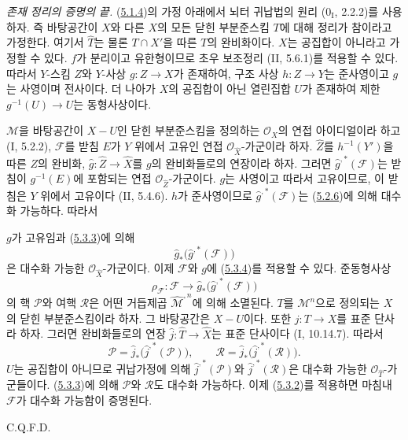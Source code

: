 \begin{env}[5.3.5]
\label{III.5.3.5-fr}
\emph{존재 정리의 증명의 끝.}
(\hyperref[III.5.1.4-fr]{5.1.4})의 가정 아래에서 뇌터 귀납법의
원리 ($0_{\mathrm I}$, 2.2.2)를 사용하자. 즉 바탕공간이 $X$와
다른 $X$의 모든 닫힌 부분준스킴 $T$에 대해 정리가 참이라고
가정한다. 여기서 $\widehat T$는 물론 $T\cap X'$을 따른 $T$의
완비화이다. $X$는 공집합이 아니라고 가정할 수 있다. $f$가
분리이고 유한형이므로 초우 보조정리 (II, 5.6.1)를 적용할 수
있다. 따라서 $Y$-스킴 $Z$와 $Y$-사상 $g:Z\to X$가 존재하여,
구조 사상 $h:Z\to Y$는 준사영이고 $g$는 사영이며 전사이다.
더 나아가 $X$의 공집합이 아닌 열린집합 $U$가 존재하여 제한
$g^{-1}(U)\to U$는 동형사상이다.

$\mathcal M$을 바탕공간이 $X-U$인 닫힌 부분준스킴을 정의하는
$\mathcal O_X$의 연접 아이디얼이라 하고 (I, 5.2.2),
$\mathcal F$를 받침 $E$가 $Y$ 위에서 고유인 연접
$\mathcal O_{\widehat X}$-가군이라 하자. $\widehat Z$를
$h^{-1}(Y')$을 따른 $Z$의 완비화,
$\widehat g:\widehat Z\to\widehat X$를 $g$의 완비화들로의
연장이라 하자. 그러면 $\widehat g^{,*}(\mathcal F)$는 받침이
$g^{-1}(E)$에 포함되는 연접 $\mathcal O_{\widehat Z}$-가군이다.
$g$는 사영이고 따라서 고유이므로, 이 받침은 $Y$ 위에서 고유이다
(II, 5.4.6). $h$가 준사영이므로
$\widehat g^{,*}(\mathcal F)$는
(\hyperref[III.5.2.6-fr]{5.2.6})에 의해 대수화 가능하다. 따라서


$g$가 고유임과 (\hyperref[III.5.3.3-fr]{5.3.3})에 의해
\[
\widehat g_*\bigl(\widehat g^{,*}(\mathcal F)\bigr)
\]
은 대수화 가능한 $\mathcal O_{\widehat X}$-가군이다. 이제
$\mathcal F$와 $g$에 (\hyperref[III.5.3.4-fr]{5.3.4})를 적용할
수 있다. 준동형사상
\[
\rho_{\mathcal F}:\mathcal F\to
\widehat g_*\bigl(\widehat g^{,*}(\mathcal F)\bigr)
\]
의 핵 $\mathcal P$와 여핵 $\mathcal R$은 어떤 거듭제곱
$\widehat{\mathcal M}^{,n}$에 의해 소멸된다. $T$를
$\mathcal M^n$으로 정의되는 $X$의 닫힌 부분준스킴이라 하자.
그 바탕공간은 $X-U$이다. 또한 $j:T\to X$를 표준 단사라 하자.
그러면 완비화들로의 연장 $\widehat j:\widehat T\to\widehat X$는
표준 단사이다 (I, 10.14.7). 따라서
\[
\mathcal P=\widehat j_*\bigl(\widehat j^{,*}(\mathcal P)\bigr),
\qquad
\mathcal R=\widehat j_*\bigl(\widehat j^{,*}(\mathcal R)\bigr).
\]
$U$는 공집합이 아니므로 귀납가정에 의해
$\widehat j^{,*}(\mathcal P)$와
$\widehat j^{,*}(\mathcal R)$은 대수화 가능한
$\mathcal O_{\widehat T}$-가군들이다.
(\hyperref[III.5.3.3-fr]{5.3.3})에 의해 $\mathcal P$와
$\mathcal R$도 대수화 가능하다. 이제
(\hyperref[III.5.3.2-fr]{5.3.2})를 적용하면 마침내
$\mathcal F$가 대수화 가능함이 증명된다.

\hfill C.Q.F.D.
\end{env}

